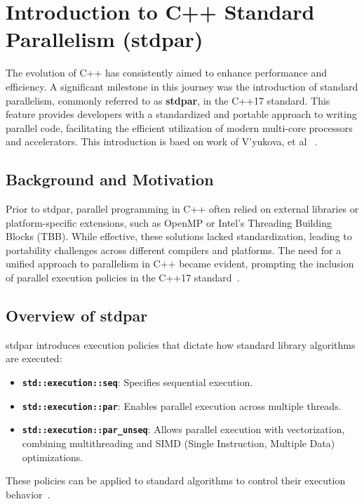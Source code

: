 \section{Introduction to C++ Standard Parallelism (stdpar)}
\label{sec:stdpar}

The evolution of C++ has consistently aimed to enhance performance and efficiency. A significant milestone in
this journey was the introduction of standard parallelism, commonly referred to as \textbf{stdpar}, in the
C++17 standard. This feature provides developers with a standardized and portable approach to writing parallel
code, facilitating the efficient utilization of modern multi-core processors and accelerators.
This introduction is baed on work of V’yukova, et al ~\cite{V'yukova2018}.

\subsection{Background and Motivation}

Prior to stdpar, parallel programming in C++ often relied on external libraries or platform-specific
extensions, such as OpenMP or Intel's Threading Building Blocks (TBB). While effective, these solutions lacked
standardization, leading to portability challenges across different compilers and platforms. The need for a
unified approach to parallelism in C++ became evident, prompting the inclusion of parallel execution policies
in the C++17 standard~\cite{V'yukova2018}.

\subsection{Overview of stdpar}

stdpar introduces execution policies that dictate how standard library algorithms are executed:

\begin{itemize}
  \item \textbf{\texttt{std::execution::seq}}: Specifies sequential execution.
  \item \textbf{\texttt{std::execution::par}}: Enables parallel execution across multiple threads.
  \item \textbf{\texttt{std::execution::par\_unseq}}: Allows parallel execution with vectorization, combining
  multithreading and SIMD (Single Instruction, Multiple Data) optimizations.
\end{itemize}

These policies can be applied to standard algorithms to control their execution behavior~\cite{V'yukova2018}.

